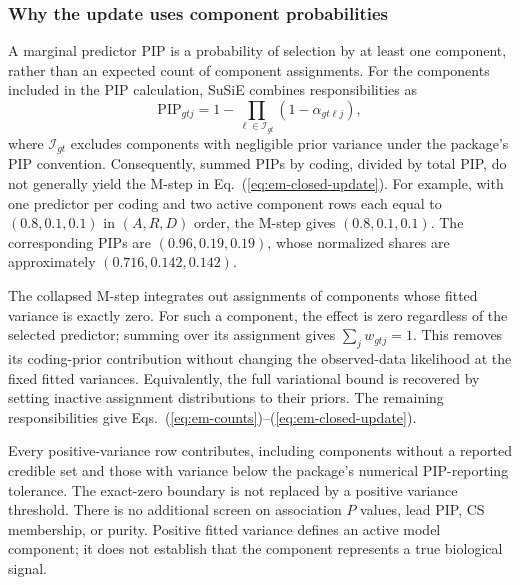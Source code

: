 \documentclass[12pt]{article}
\begin{document}
\subsubsection*{Why the update uses component probabilities}
A marginal predictor PIP is a probability of selection by at least one
component, rather than an expected count of component assignments. For
the components included in the PIP calculation, SuSiE combines
responsibilities as
\begin{equation}
 \mathrm{PIP}_{gtj}
 =1-\prod_{\ell\in\mathcal{I}_{gt}}
       (1-\alpha_{gt\ell j}),
 \label{eq:em-pip}
\end{equation}
where $\mathcal{I}_{gt}$ excludes components with negligible prior
variance under the package's PIP convention. Consequently, summed PIPs
by coding, divided by total PIP, do not generally yield the M-step in
Eq.~(\ref{eq:em-closed-update}). For example, with one predictor per
coding and two active component rows each equal to $(0.8,0.1,0.1)$ in $(A,R,D)$
order, the M-step gives $(0.8,0.1,0.1)$. The corresponding PIPs are
$(0.96,0.19,0.19)$, whose normalized shares are approximately
$(0.716,0.142,0.142)$.

The collapsed M-step integrates out assignments of components whose
fitted variance is exactly zero. For such a component, the effect is zero
regardless of the selected predictor; summing over its assignment gives
$\sum_j w_{gtj}=1$. This removes its coding-prior contribution without
changing the observed-data likelihood at the fixed fitted variances.
Equivalently, the full variational bound is recovered by setting inactive
assignment distributions to their priors. The remaining responsibilities
give Eqs.~(\ref{eq:em-counts})--(\ref{eq:em-closed-update}).

Every positive-variance row contributes, including components without a
reported credible set and those with variance below the package's numerical
PIP-reporting tolerance. The exact-zero boundary is not replaced by a
positive variance threshold. There is no additional screen on association
$P$ values, lead PIP, CS membership, or purity. Positive fitted variance
defines an active model component; it does not establish that the component
represents a true biological signal.
\end{document}
